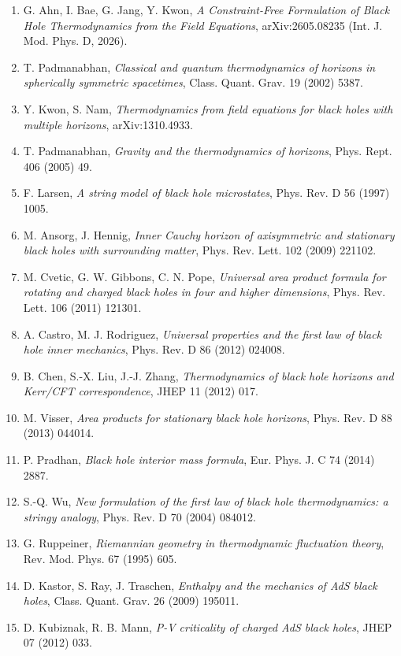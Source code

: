 \documentclass[11pt]{article}
\begin{document}
\begin{enumerate}
\item G. Ahn, I. Bae, G. Jang, Y. Kwon, \emph{A Constraint-Free Formulation of Black Hole Thermodynamics from the Field Equations}, arXiv:2605.08235 (Int. J. Mod. Phys. D, 2026).
\item T. Padmanabhan, \emph{Classical and quantum thermodynamics of horizons in spherically symmetric spacetimes}, Class. Quant. Grav. 19 (2002) 5387.
\item Y. Kwon, S. Nam, \emph{Thermodynamics from field equations for black holes with multiple horizons}, arXiv:1310.4933.
\item T. Padmanabhan, \emph{Gravity and the thermodynamics of horizons}, Phys. Rept. 406 (2005) 49.
\item F. Larsen, \emph{A string model of black hole microstates}, Phys. Rev. D 56 (1997) 1005.
\item M. Ansorg, J. Hennig, \emph{Inner Cauchy horizon of axisymmetric and stationary black holes with surrounding matter}, Phys. Rev. Lett. 102 (2009) 221102.
\item M. Cvetic, G. W. Gibbons, C. N. Pope, \emph{Universal area product formula for rotating and charged black holes in four and higher dimensions}, Phys. Rev. Lett. 106 (2011) 121301.
\item A. Castro, M. J. Rodriguez, \emph{Universal properties and the first law of black hole inner mechanics}, Phys. Rev. D 86 (2012) 024008.
\item B. Chen, S.-X. Liu, J.-J. Zhang, \emph{Thermodynamics of black hole horizons and Kerr/CFT correspondence}, JHEP 11 (2012) 017.
\item M. Visser, \emph{Area products for stationary black hole horizons}, Phys. Rev. D 88 (2013) 044014.
\item P. Pradhan, \emph{Black hole interior mass formula}, Eur. Phys. J. C 74 (2014) 2887.
\item S.-Q. Wu, \emph{New formulation of the first law of black hole thermodynamics: a stringy analogy}, Phys. Rev. D 70 (2004) 084012.
\item G. Ruppeiner, \emph{Riemannian geometry in thermodynamic fluctuation theory}, Rev. Mod. Phys. 67 (1995) 605.
\item D. Kastor, S. Ray, J. Traschen, \emph{Enthalpy and the mechanics of AdS black holes}, Class. Quant. Grav. 26 (2009) 195011.
\item D. Kubiznak, R. B. Mann, \emph{P-V criticality of charged AdS black holes}, JHEP 07 (2012) 033.

\end{enumerate}
\end{document}
